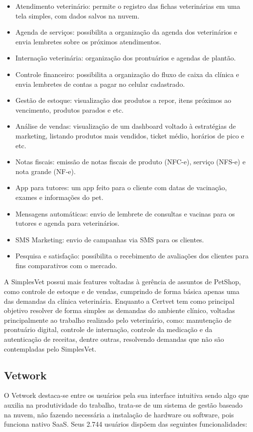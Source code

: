 \documentclass[
    12pt,               %
    openright,          %
    oneside,
    a4paper,            %
    BIBLATEX,           %
    TODO,               %
    english,            %
    brazil              %
    ]{ifsp-spo-inf-ctds}
\begin{document}
\begin{itemize}
    
    \item Atendimento veterinário: permite o registro das fichas veterinárias em uma tela simples, com dados salvos na nuvem.
    \item Agenda de serviços: possibilita a organização da agenda dos veterinários e envia lembretes sobre os próximos atendimentos.
    \item Internação veterinária: organização dos prontuários e agendas de plantão.
    \item Controle financeiro: possibilita a organização do fluxo de caixa da clínica e envia lembretes de contas a pagar no celular cadastrado.
    \item Gestão de estoque: visualização dos produtos a repor, itens próximos ao vencimento, produtos parados e etc.
    \item Análise de vendas: visualização de um dashboard voltado à estratégias de marketing, listando produtos mais vendidos, ticket médio, horários de pico e etc.
    \item Notas fiscais: emissão de notas fiscais de produto (NFC-e), serviço (NFS-e) e nota grande (NF-e).
    \item App para tutores: um app feito para o cliente com datas de vacinação, exames e informações do pet.
    \item Mensagens automáticas: envio de lembrete de consultas e vacinas para os tutores e agenda para veterinários.
    \item SMS Marketing: envio de campanhas via SMS para os clientes.
    \item Pesquisa e satisfação: possibilita o recebimento de avaliações dos clientes para fins comparativos com o mercado.
\end{itemize}

A SimplesVet possui mais features voltadas à gerência de assuntos de PetShop, como controle de estoque e de vendas, cumprindo de forma básica apenas uma das demandas da clínica veterinária. Enquanto a Certvet tem como principal objetivo resolver de forma simples as demandas do ambiente clínico, voltadas principalmente ao trabalho realizado pelo veterinário, como: manutenção de prontuário digital, controle de internação, controle da medicação e da autenticação de receitas, dentre outras, resolvendo demandas que não são contempladas pelo SimplesVet.

\subsection{Vetwork}
O Vetwork destaca-se entre os usuários pela sua interface intuitiva sendo algo que auxilia na produtividade do trabalho, trata-se de um sistema de gestão baseado na nuvem, não fazendo necessária a instalação de hardware ou software, pois funciona nativo SaaS. Seus 2.744 usuários dispõem das seguintes funcionalidades:
\end{document}
